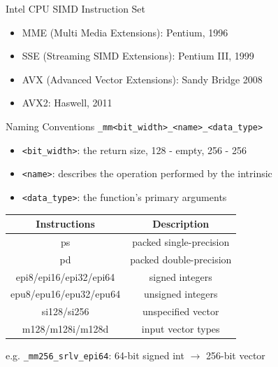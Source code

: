 \documentclass{../TexTemplate/myslide}
\begin{document}
\begin{frame}{Intel CPU SIMD Instruction Set}
\begin{itemize}
	\item MME (Multi Media Extensions): Pentium, 1996
	\item SSE (Streaming SIMD Extensions): Pentium III, 1999
	\item AVX (Advanced Vector Extensions): Sandy Bridge 2008
	\item AVX2: Haswell, 2011
\end{itemize}
\end{frame}

\begin{frame}[fragile]{Naming Conventions}
\verb'_mm<bit_width>_<name>_<data_type>'
\begin{itemize}
\item \verb'<bit_width>': the return size, 128 - empty, 256 - 256
\item \verb'<name>': describes the operation performed by the intrinsic
\item \verb'<data_type>': the function's primary arguments
\end{itemize}
\begin{center}
\begin{tabular}{cc}\hline
Instructions & Description\\\hline
ps &	packed single-precision\\
pd &	packed double-precision\\
epi8/epi16/epi32/epi64 &	signed integers\\
epu8/epu16/epu32/epu64 &	unsigned integers\\
si128/si256 &	unspecified vector\\
m128/m128i/m128d &	input vector types\\\hline
\end{tabular}
\end{center}
e.g. \verb'_mm256_srlv_epi64':  64-bit signed int $\to$ 256-bit vector
\end{frame}
\end{document}
